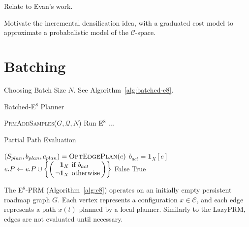 Relate to Evan's work.

Motivate the incremental densification idea,
with a graduated cost model
to approximate a probabalistic model
of the $\mathcal{C}$-space.

\section{Batching}

Choosing Batch Size $N$.
See Algorithm~\ref{alg:batched-e8}.

\begin{algorithm}
\caption{Batched-E$^8$ Planner}
\label{alg:batched-e8}
\begin{algorithmic}[1]
\Loop
   \State \textsc{PrmAddSamples}($G, \mathcal{Q}, N$)
   \State Run E$^8$ ...
\EndLoop
\EndProcedure
\end{algorithmic}
\end{algorithm}

\begin{algorithm}
\caption{Partial Path Evaluation}
\label{alg:path-evaluation}
\begin{algorithmic}[1]
         \label{line:edge-evaluation-order}
      \State $(S_{plan}, b_{plan}, c_{plan})
         = \mbox{\textsc{OptEdgePlan}}(e)$
         \State $b_{act} = \mathbf{1}_X[e]$
         \State $\arraycolsep=2pt
            e.P \leftarrow e.P \cup
            \left\{\left( \begin{array}{rl}
            \mathbf{1}_X & \mbox{if } b_{act} \\
            \lnot \mathbf{1}_X & \mbox{otherwise} \\
            \end{array} \right)
            \right\}$
            \State \Return False
         \EndIf
      \EndFor
   \EndFor
   \State \Return True
\EndFunction
\end{algorithmic}
\end{algorithm}

The E$^8$-PRM (Algorithm~\ref{alg:e8})
operates on an initially empty persistent roadmap graph $G$.
Each vertex represents a configuration $x \in \mathcal{C}$,
and each edge represents a path $x(t)$ planned by a local planner.
Similarly to the LazyPRM,
edges are not evaluated until necessary.

